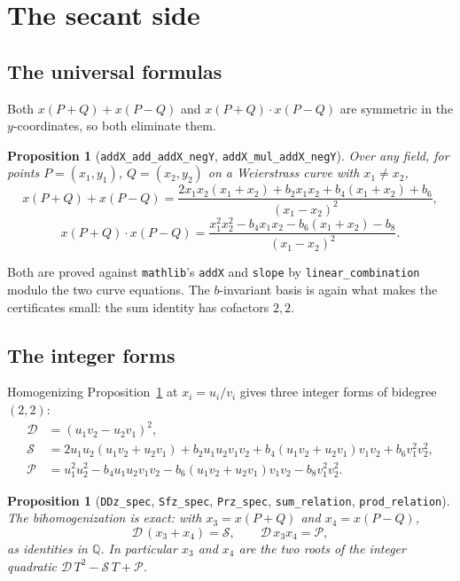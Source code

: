 \documentclass[11pt,reqno]{amsart}
\theoremstyle{plain}
\newtheorem{proposition}[theorem]{Proposition}
\theoremstyle{definition}
\theoremstyle{remark}
\DeclareRobustCommand{\lt}[1]{\texttt{#1}}
\newcommand{\DDz}{\mathcal{D}}
\newcommand{\Sfz}{\mathcal{S}}
\newcommand{\Prz}{\mathcal{P}}
\begin{document}
\section{The secant side}\label{sec:secant}

\subsection{The universal formulas}

Both $x(P{+}Q) + x(P{-}Q)$ and $x(P{+}Q)\cdot x(P{-}Q)$ are symmetric in
the $y$-coordinates, so both eliminate them.

\begin{proposition}[\lt{addX\_add\_addX\_negY},
\lt{addX\_mul\_addX\_negY}]\label{prop:secform}
Over any field, for points $P = (x_1,y_1)$, $Q = (x_2,y_2)$ on a
Weierstrass curve with $x_1 \ne x_2$,
\[
  x(P{+}Q) + x(P{-}Q)
    = \frac{2x_1x_2(x_1+x_2) + b_2x_1x_2 + b_4(x_1+x_2) + b_6}
           {(x_1-x_2)^2},
\]
\[
  x(P{+}Q)\cdot x(P{-}Q)
    = \frac{x_1^2x_2^2 - b_4x_1x_2 - b_6(x_1+x_2) - b_8}
           {(x_1-x_2)^2}.
\]
\end{proposition}

Both are proved against \texttt{mathlib}'s \lt{addX} and \lt{slope} by
\lt{linear\_combination} modulo the two curve equations. The
$b$-invariant basis is again what makes the certificates small: the sum
identity has cofactors $2,2$.

\subsection{The integer forms}

Homogenizing Proposition~\ref{prop:secform} at $x_i = u_i/v_i$ gives
three integer forms of bidegree $(2,2)$:
\begin{equation}\label{eq:secforms}
\begin{aligned}
  \DDz &= (u_1v_2 - u_2v_1)^2,\\
  \Sfz &= 2u_1u_2(u_1v_2 + u_2v_1) + b_2u_1u_2v_1v_2
          + b_4(u_1v_2+u_2v_1)v_1v_2 + b_6v_1^2v_2^2,\\
  \Prz &= u_1^2u_2^2 - b_4u_1u_2v_1v_2
          - b_6(u_1v_2+u_2v_1)v_1v_2 - b_8v_1^2v_2^2 .
\end{aligned}
\end{equation}

\begin{proposition}[\lt{DDz\_spec}, \lt{Sfz\_spec}, \lt{Prz\_spec},
\lt{sum\_relation}, \lt{prod\_relation}]\label{prop:spec}
The bihomogenization is exact: with $x_3 = x(P{+}Q)$ and
$x_4 = x(P{-}Q)$,
\[
  \DDz\,(x_3 + x_4) = \Sfz, \qquad \DDz\, x_3x_4 = \Prz ,
\]
as identities in $\mathbb{Q}$. In particular $x_3$ and $x_4$ are the two
roots of the integer quadratic
$\DDz\,T^2 - \Sfz\,T + \Prz$.
\end{proposition}
\end{document}
